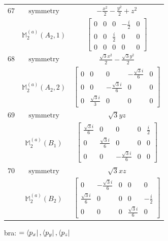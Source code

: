 \documentclass[fleqn,8pt,landscape]{jsarticle}
\begin{document}
\begin{longtable}{ccc}
$ 67 $ & $ \text{symmetry} $ & $ - \frac{x^{2}}{2} - \frac{y^{2}}{2} + z^{2} $ \\
$  $ & $ \mathbb{M}_{2}^{(a)}(A_{2},1) $ & $ \begin{bmatrix} 0 & 0 & 0 & - \frac{i}{2} & 0 \\ 0 & 0 & \frac{i}{2} & 0 & 0 \\ 0 & 0 & 0 & 0 & 0 \end{bmatrix} $ \\ \hline
$ 68 $ & $ \text{symmetry} $ & $ \frac{\sqrt{3} x^{2}}{2} - \frac{\sqrt{3} y^{2}}{2} $ \\
$  $ & $ \mathbb{M}_{2}^{(a)}(A_{2},2) $ & $ \begin{bmatrix} 0 & 0 & 0 & - \frac{\sqrt{3} i}{6} & 0 \\ 0 & 0 & - \frac{\sqrt{3} i}{6} & 0 & 0 \\ 0 & \frac{\sqrt{3} i}{3} & 0 & 0 & 0 \end{bmatrix} $ \\ \hline
$ 69 $ & $ \text{symmetry} $ & $ \sqrt{3} y z $ \\
$  $ & $ \mathbb{M}_{2}^{(a)}(B_{1}) $ & $ \begin{bmatrix} \frac{\sqrt{3} i}{6} & 0 & 0 & 0 & \frac{i}{2} \\ 0 & \frac{\sqrt{3} i}{6} & 0 & 0 & 0 \\ 0 & 0 & - \frac{\sqrt{3} i}{6} & 0 & 0 \end{bmatrix} $ \\ \hline
$ 70 $ & $ \text{symmetry} $ & $ \sqrt{3} x z $ \\
$  $ & $ \mathbb{M}_{2}^{(a)}(B_{2}) $ & $ \begin{bmatrix} 0 & - \frac{\sqrt{3} i}{6} & 0 & 0 & 0 \\ \frac{\sqrt{3} i}{6} & 0 & 0 & 0 & - \frac{i}{2} \\ 0 & 0 & 0 & \frac{\sqrt{3} i}{6} & 0 \end{bmatrix} $ \\ \hline
\end{longtable}
bra: $=\bra{p_{x}}, \bra{p_{y}}, \bra{p_{z}}$
\end{document}
